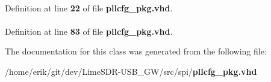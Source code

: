 \paragraph[{t\+\_\+\+F\+R\+O\+M\+\_\+\+P\+L\+L\+C\+FG}]{ {\bfseries \textcolor{vhdlchar}{ }} \hspace{0.3cm}{\ttfamily [Record]}}\label{classpllcfg__pkg_a75f3ea99ebc7158b7832607f36898a83}


Definition at line {\bf 22} of file {\bf pllcfg\+\_\+pkg.\+vhd}.

\paragraph[{t\+\_\+\+T\+O\+\_\+\+P\+L\+L\+C\+FG}]{ {\bfseries \textcolor{vhdlchar}{ }} \hspace{0.3cm}{\ttfamily [Record]}}\label{classpllcfg__pkg_ad81ed21addee86d751844c2cd6e7335d}


Definition at line {\bf 83} of file {\bf pllcfg\+\_\+pkg.\+vhd}.



The documentation for this class was generated from the following file\+:\begin{DoxyCompactItemize}
\item 
/home/erik/git/dev/\+Lime\+S\+D\+R-\/\+U\+S\+B\+\_\+\+G\+W/src/spi/{\bf pllcfg\+\_\+pkg.\+vhd}\end{DoxyCompactItemize}

